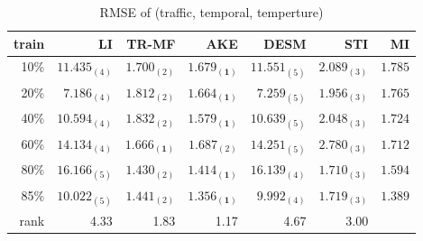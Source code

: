 \begin{table} [htbp]
\setlength{\tabcolsep}{2pt}
\centering
\caption{RMSE of (traffic, temporal, temperture)}
\label{table:traffic_temporal_tem}
\begin{tabular}{ r | r r r r r r}
	train	&LI	&TR-MF	&AKE	&DESM	&STI &MI\\ \hline
	10\% & $ 11.435_{(4)} $ & $ 1.700_{(2)} $ & $ \mathbf{ 1.679_{(1)} } $ & $ 11.551_{(5)} $ & $ 2.089_{(3)} $ &$1.785$\\
	20\% & $ 7.186_{(4)} $ & $ 1.812_{(2)} $ & $ \mathbf{ 1.664_{(1)} } $ & $ 7.259_{(5)} $ & $ 1.956_{(3)} $ &$1.765$\\
	40\% & $ 10.594_{(4)} $ & $ 1.832_{(2)} $ & $ \mathbf{ 1.579_{(1)} } $ & $ 10.639_{(5)} $ & $ 2.048_{(3)} $& $1.724$\\
	60\% & $ 14.134_{(4)} $ & $ \mathbf{ 1.666_{(1)} } $ & $ 1.687_{(2)} $ & $ 14.251_{(5)} $ & $ 2.780_{(3)} $ &$1.712$\\
	80\% & $ 16.166_{(5)} $ & $ 1.430_{(2)} $ & $ \mathbf{ 1.414_{(1)} } $ & $ 16.139_{(4)} $ & $ 1.710_{(3)} $ &$1.594$\\
	85\% & $ 10.022_{(5)} $ & $ 1.441_{(2)} $ & $ \mathbf{ 1.356_{(1)} } $ & $ 9.992_{(4)} $ & $ 1.719_{(3)} $ &$1.389$\\ \hline
	rank &4.33 &1.83 &1.17 &4.67 &3.00 \\
\end{tabular}
\end{table}



%
%
%
%
%
